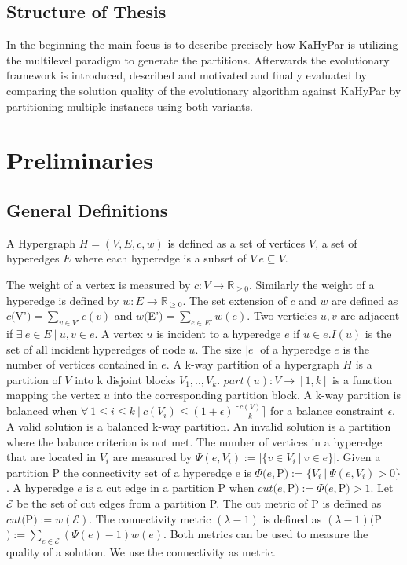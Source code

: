 \documentclass[a4paper,12pt,titlepage, BCOR7mm,headsepline]{scrbook}
\numberwithin{equation}{section}
\begin{document}
\section{Structure of Thesis}
In the beginning the main focus is to describe precisely how KaHyPar is utilizing the multilevel paradigm to generate the partitions. Afterwards the evolutionary framework is introduced, described and motivated and finally evaluated by comparing the solution quality of the evolutionary algorithm against KaHyPar by partitioning multiple instances using both variants. 
\chapter{Preliminaries}
\section{General Definitions}

A Hypergraph $H = (V, E, c, w)$ is defined as a set of vertices $V$, a set of hyperedges $E$ where each hyperedge is a subset of $V \ e \subseteq V$.

The weight of a vertex is measured by $c: V \rightarrow  \mathbb R_{\ge 0}$. Similarly the weight of a hyperedge is defined by $w: E \rightarrow  \mathbb R_{\ge 0}$. 
The set extension of $c$ and $w$ are defined as $c($V'$) = \sum_{v \in V'} c(v)$ and $w($E'$) = \sum_{e \in E'} w(e)$. 
Two verticies $u, v$ are adjacent if $\exists\ e \in E\ |\ u, v \in e$. A vertex $u$ is incident to a hyperedge $e$ if $ u \in e$.$I(u)$ is the set of all incident hyperedges of node $u$. The size $|e|$ of a hyperedge $e$ is the number of vertices contained in $e$. A k-way partition of a hypergraph $H$ is a partition of $V$ into k disjoint blocks $V_1, .., V_k$. $part(u): V \rightarrow [1, k]$ is a function mapping the vertex $u$ into the corresponding partition block.
A k-way partition is balanced when $\forall\  1 \le i \le k\ |\ c(V_i) \le (1 + \epsilon) \lceil \frac{c(V)}{k} \rceil $ for a balance constraint $\epsilon$.
A valid solution is a balanced k-way partition. An invalid solution is a partition where the balance criterion is not met.
The number of vertices in a hyperedge that are located in $V_i$ are measured by $\Psi(e,V_i) := |\{v \in V_i \ |\ v \in e \}|$. Given a partition P the connectivity set of a hyperedge e is $\Phi(e, $P$) :=  \{V_i\ |\ \Psi(e, V_i) > 0\}$. 
A hyperedge $e$ is a cut edge in a partition P when $cut(e, $P$) := \Phi(e, $P$) > 1$. 
Let $\mathcal{E}$ be the set of cut edges from a partition P. The cut metric of P is defined as $cut($P$) := w(\mathcal{E})$.
The connectivity metric $(\lambda - 1)$ is defined as $(\lambda - 1)($P$) := \sum_{e \in \mathcal{E}}(\Psi(e) - 1)w(e)$.
Both metrics can be used to measure the quality of a solution. We use the connectivity as metric. 
\end{document}
